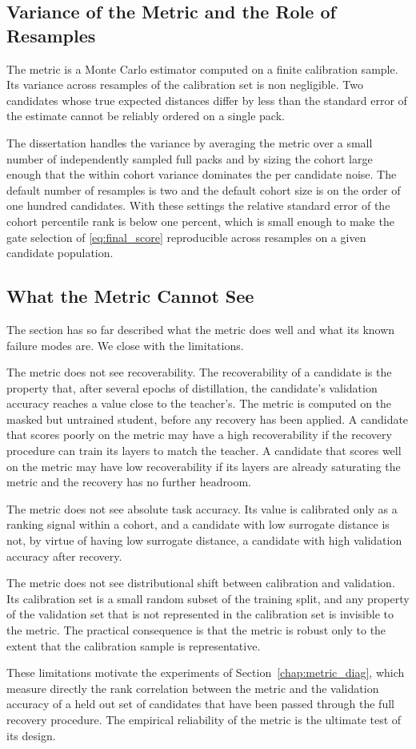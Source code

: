 \subsection{Variance of the Metric and the Role of Resamples}

The metric is a Monte Carlo estimator computed on a finite calibration sample. Its variance across resamples of the calibration set is non negligible. Two candidates whose true expected distances differ by less than the standard error of the estimate cannot be reliably ordered on a single pack.

The dissertation handles the variance by averaging the metric over a small number of independently sampled full packs and by sizing the cohort large enough that the within cohort variance dominates the per candidate noise. The default number of resamples is two and the default cohort size is on the order of one hundred candidates. With these settings the relative standard error of the cohort percentile rank is below one percent, which is small enough to make the gate selection of \eqref{eq:final_score} reproducible across resamples on a given candidate population.

\subsection{What the Metric Cannot See}

The section has so far described what the metric does well and what its known failure modes are. We close with the limitations.

The metric does not see recoverability. The recoverability of a candidate is the property that, after several epochs of distillation, the candidate's validation accuracy reaches a value close to the teacher's. The metric is computed on the masked but untrained student, before any recovery has been applied. A candidate that scores poorly on the metric may have a high recoverability if the recovery procedure can train its layers to match the teacher. A candidate that scores well on the metric may have low recoverability if its layers are already saturating the metric and the recovery has no further headroom.

The metric does not see absolute task accuracy. Its value is calibrated only as a ranking signal within a cohort, and a candidate with low surrogate distance is not, by virtue of having low surrogate distance, a candidate with high validation accuracy after recovery.

The metric does not see distributional shift between calibration and validation. Its calibration set is a small random subset of the training split, and any property of the validation set that is not represented in the calibration set is invisible to the metric. The practical consequence is that the metric is robust only to the extent that the calibration sample is representative.

These limitations motivate the experiments of Section~\ref{chap:metric_diag}, which measure directly the rank correlation between the metric and the validation accuracy of a held out set of candidates that have been passed through the full recovery procedure. The empirical reliability of the metric is the ultimate test of its design.
